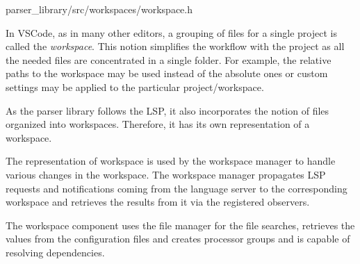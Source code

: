 
{parser\_library/src/workspaces/workspace.h}

In VSCode, as in many other editors, a grouping of files for a single project is called the \emph{workspace}. This notion simplifies the workflow with the project as all the needed files are concentrated in a single folder. For example, the relative paths to the workspace may be used instead of the absolute ones or custom settings may be applied to the particular project/workspace. 

As the parser library follows the LSP, it also incorporates the notion of files organized into workspaces. Therefore, it has its own representation of a workspace.

The representation of workspace is used by the workspace manager to handle various changes in the workspace. The workspace manager propagates LSP requests and notifications coming from the language server to the corresponding workspace and retrieves the results from it via the registered observers.

The workspace component uses the file manager for the file searches, retrieves the values from the configuration files and creates processor groups and is capable of resolving dependencies.

